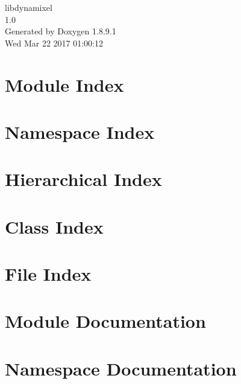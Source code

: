 \documentclass[twoside]{book}
\newcommand{\+}{\discretionary{\mbox{\scriptsize$\hookleftarrow$}}{}{}}
\newcommand{\clearemptydoublepage}{%
  \newpage{\pagestyle{empty}\cleardoublepage}%
}
\begin{document}
\hypersetup{pageanchor=false,
             bookmarks=true,
             bookmarksnumbered=true,
             pdfencoding=unicode
            }
\begin{titlepage}
\vspace*{7cm}
\begin{center}%
{\Large libdynamixel \\[1ex]\large 1.\+0 }\\
\vspace*{1cm}
{\large Generated by Doxygen 1.8.9.1}\\
\vspace*{0.5cm}
{\small Wed Mar 22 2017 01:00:12}\\
\end{center}
\end{titlepage}
\clearemptydoublepage
\tableofcontents
\clearemptydoublepage
{}
\hypersetup{pageanchor=true}

\chapter{Module Index}

\chapter{Namespace Index}

\chapter{Hierarchical Index}

\chapter{Class Index}

\chapter{File Index}

\chapter{Module Documentation}


\chapter{Namespace Documentation}







\end{document}
